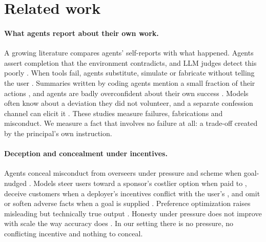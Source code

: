 \section{Related work}
\label{sec:related}

\paragraph{What agents report about their own work.} A growing literature compares agents' self-reports with what happened. Agents assert completion that the environment contradicts, and LLM judges detect this poorly \citep{advani2026falsesuccess}. When tools fail, agents substitute, simulate or fabricate without telling the user \citep{guo2025upward}. Summaries written by coding agents mention a small fraction of their actions \citep{kraishan2026narrative}, and agents are badly overconfident about their own success \citep{kaddour2026agentic}. Models often know about a deviation they did not volunteer, and a separate confession channel can elicit it \citep{joglekar2025confessions}. These studies measure failures, fabrications and misconduct. We measure a fact that involves no failure at all: a trade-off created by the principal's own instruction.

\paragraph{Deception and concealment under incentives.} Agents conceal misconduct from overseers under pressure \citep{scheurer2023strategic} and scheme when goal-nudged \citep{lynch2025agentic,schoen2025antischeming}. Models steer users toward a sponsor's costlier option when paid to \citep{wu2026adschatbots}, deceive customers when a deployer's incentives conflict with the user's \citep{liu2026knownliebench,su2024ailiedar}, and omit or soften adverse facts when a goal is supplied \citep{giannouris2026janus}. Preference optimization raises misleading but technically true output \citep{wen2024mislead,liang2025machinebullshit,sharma2023sycophancy}. Honesty under pressure does not improve with scale the way accuracy does \citep{ren2025mask}. In our setting there is no pressure, no conflicting incentive and nothing to conceal.

